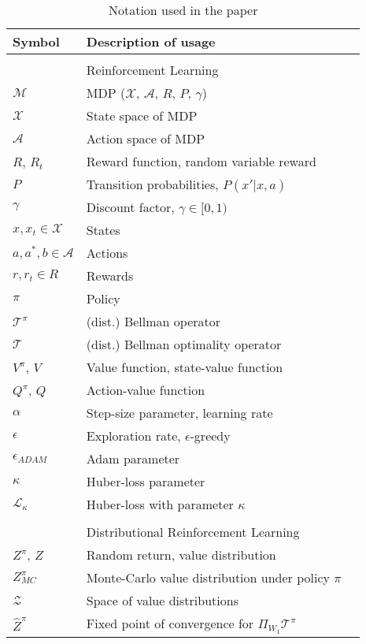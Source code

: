 \documentclass[letterpaper]{article}
\newcommand{\cX}{\mathcal{X}}
\newcommand{\cM}{\mathcal{M}}
\newcommand{\cA}{\mathcal{A}}
\newcommand{\cZ}{\mathcal{Z}}
\newcommand{\cT}{\mathcal{T}}
\newcommand{\cL}{\mathcal{L}}
\begin{document}
\begin{table}[ht]
\centering
\caption{Notation used in the paper}
\label{my-label}
\begin{tabular}{lll}
  Symbol        &  Description of usage\\
  \hline \\
                & Reinforcement Learning \\
  \hline
  $\cM$         &  MDP ($\cX$, $\cA$, $R$, $P$, $\gamma$) \\
  $\cX$         &  State space of MDP \\
  $\cA$         &  Action space of MDP \\
  $R$, $R_t$    &  Reward function, random variable reward \\
  $P$           &  Transition probabilities, $P(x' | x, a)$ \\
  $\gamma$      &  Discount factor, $\gamma \in [0, 1)$ \\
  $x,x_t \in \cX$ & States \\
  $a, a^*, b \in \cA$ & Actions \\
  $r, r_t \in R$    &   Rewards\\
  $\pi$         & Policy \\
  $\cT^\pi$     & (dist.) Bellman operator \\
  $\cT$         & (dist.) Bellman optimality operator \\
  $V^\pi$, $V$  & Value function, state-value function \\
  $Q^\pi$, $Q$  & Action-value function \\
  $\alpha$      & Step-size parameter, learning rate \\
  $\epsilon$    & Exploration rate, $\epsilon$-greedy \\
  $\epsilon_{ADAM}$ & Adam parameter \\
  $\kappa$      & Huber-loss parameter  \\
  $\cL_\kappa$  & Huber-loss with parameter $\kappa$ \\
  \hline \\
                & Distributional Reinforcement Learning \\
  \hline
  $Z^\pi$, $Z$  & Random return, value distribution \\
  $Z^\pi_{MC}$  & Monte-Carlo value distribution under policy $\pi$ \\
  $\cZ$         & Space of value distributions \\
  $\hat{Z}^\pi$ & Fixed point of convergence for $\Pi_{W_1} \cT^\pi$ \\

\end{tabular}
\end{table}
\end{document}
